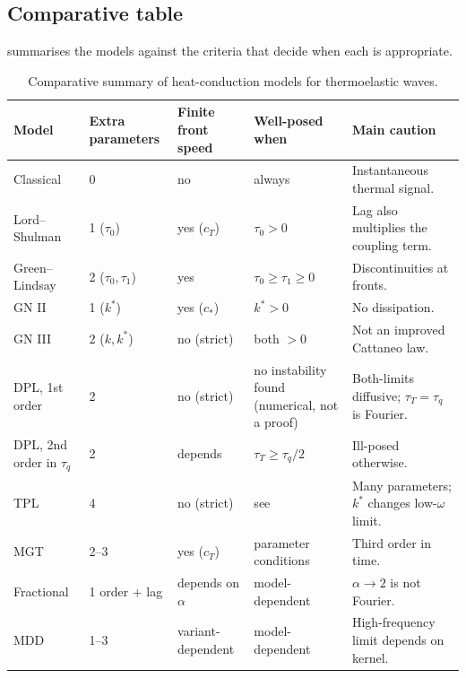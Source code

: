 \subsection{Comparative table}
 summarises the models against the criteria that decide when each is appropriate.
\begin{table}[ht]\centering\small
\caption{Comparative summary of heat-conduction models for thermoelastic waves.}\label{tab:final}
\begin{tabularx}{\textwidth}{@{}p{2.3cm}p{1.5cm}p{1.9cm}p{2.3cm}X@{}}\toprule
Model & Extra parameters & Finite front speed & Well-posed when & Main caution\\\midrule
Classical & 0 & no & always & Instantaneous thermal signal.\\
Lord--Shulman & 1 ($\tau_0$) & yes ($c_T$) & $\tau_0>0$ & Lag also multiplies the coupling term.\\
Green--Lindsay & 2 ($\tau_0,\tau_1$) & yes & $\tau_0\ge\tau_1\ge0$ & Discontinuities at fronts.\\
GN II & 1 ($k^*$) & yes ($c_*$) & $k^*>0$ & No dissipation.\\
GN III & 2 ($k,k^*$) & no (strict) & both $>0$ & Not an improved Cattaneo law.\\
DPL, 1st order & 2 & no (strict) & no instability found (numerical, not a proof) & Both-limits diffusive; $\tau_T=\tau_q$ is Fourier.\\
DPL, 2nd order in $\tau_q$ & 2 & depends & $\tau_T\ge\tau_q/2$ & Ill-posed otherwise.\\
TPL & 4 & no (strict) & see \citep{Chirita2016} & Many parameters; $k^*$ changes low-$\omega$ limit.\\
MGT & 2--3 & yes ($c_T$) & parameter conditions & Third order in time.\\
Fractional & 1 order + lag & depends on $\alpha$ & model-dependent & $\alpha\to2$ is not Fourier.\\
MDD & 1--3 & variant-dependent & model-dependent & High-frequency limit depends on kernel.\\\bottomrule
\end{tabularx}
\end{table}

